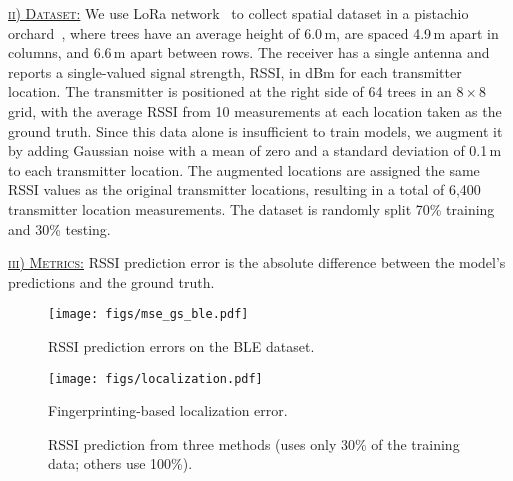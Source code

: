 \underline{\textsc{ii) Dataset:}} 
We use LoRa network~\cite{shahid2021concurrent} to collect spatial dataset in a pistachio orchard~\cite{ding2024optimizing}, where trees have an average height of 6.0\,m, are spaced 4.9\,m apart in columns, and 6.6\,m apart between rows.  
The receiver has a single antenna and reports a single-valued signal strength, RSSI, in dBm for each transmitter location.  
The transmitter is positioned at the right side of 64 trees in an $8 \times 8$ grid, with the average RSSI from 10 measurements at each location taken as the ground truth.  
Since this data alone is insufficient to train models, we augment it by adding Gaussian noise with a mean of zero and a standard deviation of 0.1\,m to each transmitter location.  
The augmented locations are assigned the same RSSI values as the original transmitter locations, resulting in a total of 6,400 transmitter location measurements.  
The dataset is randomly split 70\% training and 30\% testing.  



\underline{\textsc{iii) Metrics:}}
RSSI prediction error is the absolute difference between the model's predictions and the ground truth.


\begin{figure}[t]
	\begin{minipage}[t]{0.48\linewidth} 
    \texttt{[image: figs/mse\_gs\_ble.pdf]}
\caption{RSSI prediction errors on the BLE dataset.}
        \label{fig_amplitude_phase}
	\end{minipage}
 \hspace{0.02in}
 	\begin{minipage}[t]{0.48\linewidth} 
    \texttt{[image: figs/localization.pdf]}
        \caption{Fingerprinting-based localization error.}
        \label{fig_amplitude_2s}
	\end{minipage}
 \Description[]{}
\end{figure}


\begin{figure*}[tp]
\caption{RSSI prediction from three methods (\ourSystem uses only 30\% of the training data; others use 100\%).}
	\label{fig_case_study_esp}
  \Description[]{}
  \vspace{-10pt}
\end{figure*}

